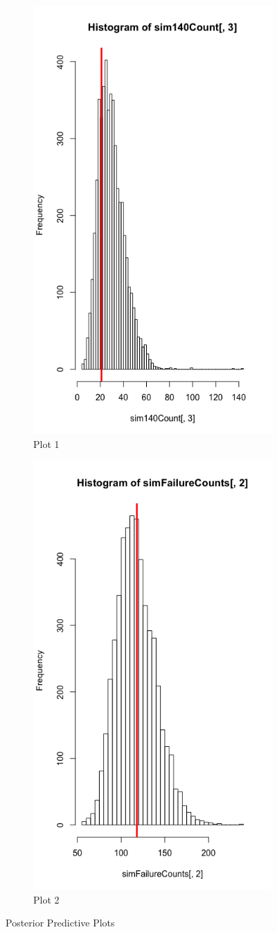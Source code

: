 \documentclass[12pt]{article}
\begin{document}
\begin{figure}
\centering
\begin{subfigure}{.5\textwidth}
  \centering
  \includegraphics[width=.4\linewidth]{Rplot1}
  \caption{Plot 1}
  \label{fig:sub1}
\end{subfigure}%
\begin{subfigure}{.5\textwidth}
  \centering
  \includegraphics[width=.4\linewidth]{Rplot2}
  \caption{Plot 2}
  \label{fig:sub2}
\end{subfigure}
\caption{Posterior Predictive Plots}
\label{fig:test}
\end{figure}
\end{document}
